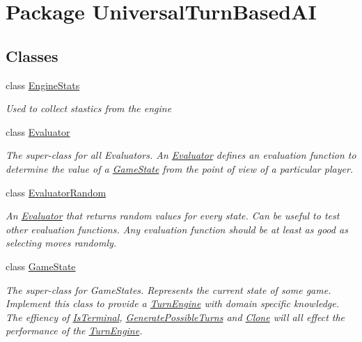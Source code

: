 \hypertarget{namespace_universal_turn_based_a_i}{}\section{Package Universal\+Turn\+Based\+A\+I}
\label{namespace_universal_turn_based_a_i}
\subsection*{Classes}
\begin{DoxyCompactItemize}
\item 
class \hyperlink{class_universal_turn_based_a_i_1_1_engine_stats}{Engine\+Stats}
\begin{DoxyCompactList}\small\item\em Used to collect stastics from the engine \end{DoxyCompactList}\item 
class \hyperlink{class_universal_turn_based_a_i_1_1_evaluator}{Evaluator}
\begin{DoxyCompactList}\small\item\em The super-\/class for all Evaluators. An \hyperlink{class_universal_turn_based_a_i_1_1_evaluator}{Evaluator} defines an evaluation function to determine the value of a \hyperlink{class_universal_turn_based_a_i_1_1_game_state}{Game\+State} from the point of view of a particular player. \end{DoxyCompactList}\item 
class \hyperlink{class_universal_turn_based_a_i_1_1_evaluator_random}{Evaluator\+Random}
\begin{DoxyCompactList}\small\item\em An \hyperlink{class_universal_turn_based_a_i_1_1_evaluator}{Evaluator} that returns random values for every state. Can be useful to test other evaluation functions. Any evaluation function should be at least as good as selecting moves randomly. \end{DoxyCompactList}\item 
class \hyperlink{class_universal_turn_based_a_i_1_1_game_state}{Game\+State}
\begin{DoxyCompactList}\small\item\em The super-\/class for Game\+States. Represents the current state of some game. Implement this class to provide a \hyperlink{class_universal_turn_based_a_i_1_1_turn_engine}{Turn\+Engine} with domain specific knowledge. The effiency of \hyperlink{class_universal_turn_based_a_i_1_1_game_state_a2d877d322bd57b7c6962d09b20baeebb}{Is\+Terminal}, \hyperlink{class_universal_turn_based_a_i_1_1_game_state_a252554bfd9fd58bdc06bd6f49b716240}{Generate\+Possible\+Turns} and \hyperlink{class_universal_turn_based_a_i_1_1_game_state_a7e9d117069df3da5b42eeadecf33a326}{Clone} will all effect the performance of the \hyperlink{class_universal_turn_based_a_i_1_1_turn_engine}{Turn\+Engine}. \end{DoxyCompactList}\item 

\end{DoxyCompactItemize}
